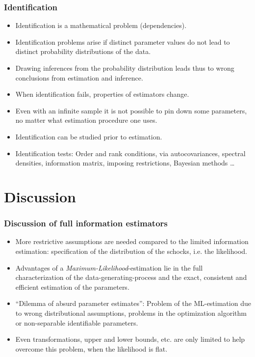\documentclass[handout]{beamer}  %
\begin{document}
\begin{frame}\frametitle{Identification}
\begin{itemize}
  \item Identification is a mathematical problem (dependencies).
  \item Identification problems arise if distinct parameter values do not lead to distinct probability distributions of the data.
  \item Drawing inferences from the probability distribution leads thus to wrong conclusions from estimation and inference.
  \item When identification fails, properties of estimators change.
  \item Even with an infinite sample it is not possible to pin down some parameters, no matter what estimation procedure one uses.
  \item Identification can be studied prior to estimation.  
  \item Identification tests: Order and rank conditions, via autocovariances, spectral densities, information matrix, imposing restrictions, Bayesian methods \dots
\end{itemize}
\end{frame}


\section{Discussion}

\begin{frame}\frametitle{Discussion of full information estimators}
  \begin{itemize}
       \item More restrictive assumptions are needed compared to the limited information estimation: specification of the distribution of the schocks, i.e. the likelihood.
    \item Advantages of a \emph{Maximum-Likelihood}-estimation lie in the full characterization of the data-generating-process and the exact, consistent and efficient estimation of the parameters.
    \item \enquote{Dilemma of absurd parameter estimates}: Problem of the ML-estimation due to wrong distributional assumptions, problems in the optimization algorithm or non-separable identifiable parameters.
    \item Even transformations, upper and lower bounds, etc. are only limited to help overcome this problem, when the likelihood is flat.
  \end{itemize}


\end{frame}
\end{document}
